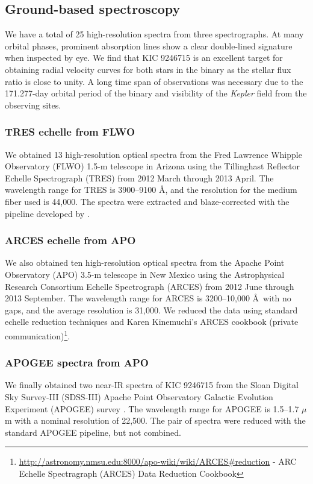 \subsection{Ground-based spectroscopy}\label{spectra}
We have a total of 25 high-resolution spectra from three spectrographs. At many orbital phases, prominent absorption lines show a clear double-lined signature when inspected by eye. We find that KIC 9246715 is an excellent target for obtaining radial velocity curves for both stars in the binary as the stellar flux ratio is close to unity. A long time span of observations was necessary due to the 171.277-day orbital period of the binary and visibility of the \emph{Kepler} field from the observing sites.

\subsubsection{TRES echelle from FLWO}\label{tres}
We obtained 13 high-resolution optical spectra from the Fred Lawrence Whipple Observatory (FLWO) 1.5-m telescope in Arizona using the Tillinghast Reflector Echelle Spectrograph (TRES) from 2012 March through 2013 April. The wavelength range for TRES is 3900--9100 \AA, and the resolution for the medium fiber used is 44,000. The spectra were extracted and blaze-corrected with the pipeline developed by \citet{buc10}.

\subsubsection{ARCES echelle from APO}\label{arces}
We also obtained ten high-resolution optical spectra from the Apache Point Observatory (APO) 3.5-m telescope in New Mexico using the Astrophysical Research Consortium Echelle Spectrograph (ARCES) from 2012 June through 2013 September. The wavelength range for ARCES is 3200--10,000 \AA \ with no gaps, and the average resolution is 31,000. We reduced the data using standard echelle reduction techniques and Karen Kinemuchi's ARCES cookbook (private communication)\footnote{\url{http://astronomy.nmsu.edu:8000/apo-wiki/wiki/ARCES\#reduction} - ARC Echelle Spectragraph (ARCES) Data Reduction Cookbook}.

\subsubsection{APOGEE spectra from APO}\label{apogee}
We finally obtained two near-IR spectra of KIC 9246715 from the Sloan Digital Sky Survey-III (SDSS-III) Apache Point Observatory Galactic Evolution Experiment (APOGEE) survey \citep{2015arXiv150100963A}. The wavelength range for APOGEE is 1.5--1.7 $\mu$m with a nominal resolution of 22,500. The pair of spectra were reduced with the standard APOGEE pipeline, but not combined.

